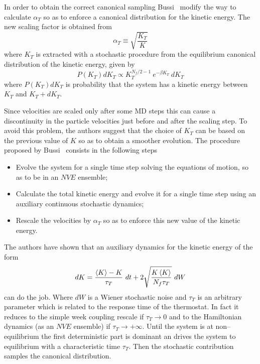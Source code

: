 In order to obtain the correct canonical sampling Bussi \etal\, \cite{Bussi} modify the way to calculate
$\alpha_T$ so as to enforce a canonical distribution for the kinetic energy. The new scaling factor is obtained
from
\begin{equation*}
	\alpha_{T} \equiv \sqrt{\frac{K_T}{K}}
\end{equation*}
where $K_T$ is extracted with a stochastic procedure from the equilibrium canonical distribution of the kinetic
energy, given by
\begin{equation*}
	P(K_T)dK_T \propto K_T^{N_f/2-1}\ e^{-\beta K_T}\ dK_T
\end{equation*}
where $P(K_T)dK_T$ is probability that the system has a kinetic energy between $K_T$ and $K_T + dK_T$.

Since velocities are scaled only after some \ac{MD} steps this can cause a discontinuity in the particle
velocities just before and after the scaling step. To avoid this problem, the authors suggest that the choice of
$K_T$ can be based on the previous value of $K$ so as to obtain a smoother evolution. The procedure proposed by
Bussi \etal\, consists in the following steps
\begin{itemize}
	\item Evolve the system for a single time step solving the equations of motion, so as to be in an $NVE$ ensemble;
	\item Calculate the total kinetic energy and evolve it for a single time step using an auxiliary continuous stochastic dynamics;
	\item Rescale the velocities by $\alpha_T$ so as to enforce this new value of the kinetic energy.
\end{itemize}

The authors have shown that an auxiliary dynamics for the kinetic energy of the form
\begin{equation*}
	dK = \frac{\left \langle K \right \rangle - K}{\tau_T}\ dt + 2 \sqrt{\frac{K\left \langle K \right \rangle}{N_f\tau_T}}\ dW
\end{equation*}
can do the job. Where $dW$ is a Wiener stochastic noise and $\tau_T$ is an arbitrary parameter which is related
to the response time of the thermostat. In fact it reduces to the simple week coupling rescale if
$\tau_T\rightarrow 0$ and to the Hamiltonian dynamics (as an $NVE$ ensemble) if $\tau_T\rightarrow +\infty$.
Until the system is at non--equilibrium the first deterministic part is dominant an drives the system to
equilibrium with a characteristic time $\tau_T$. Then the stochastic contribution samples the canonical
distribution.



